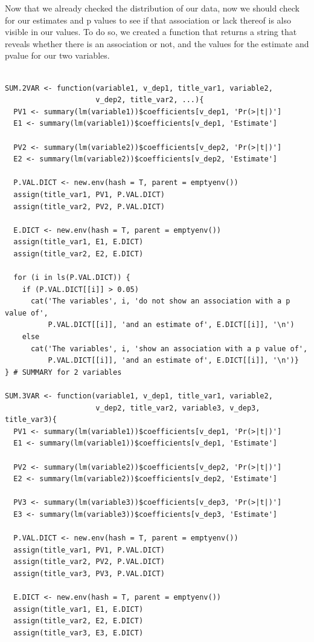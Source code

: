 \documentclass{article}
\begin{document}
Now that we already checked the distribution of our data, now we should check for our estimates and p values to see if that association or lack thereof is also visible in our values. To do so, we created a function that returns a string that reveals whether there is an association or not, and the values for the estimate and pvalue for our two variables.


\begin{lstlisting}

SUM.2VAR <- function(variable1, v_dep1, title_var1, variable2, 
                     v_dep2, title_var2, ...){
  PV1 <- summary(lm(variable1))$coefficients[v_dep1, 'Pr(>|t|)']
  E1 <- summary(lm(variable1))$coefficients[v_dep1, 'Estimate']
  
  PV2 <- summary(lm(variable2))$coefficients[v_dep2, 'Pr(>|t|)']
  E2 <- summary(lm(variable2))$coefficients[v_dep2, 'Estimate']
  
  P.VAL.DICT <- new.env(hash = T, parent = emptyenv())
  assign(title_var1, PV1, P.VAL.DICT)
  assign(title_var2, PV2, P.VAL.DICT)
  
  E.DICT <- new.env(hash = T, parent = emptyenv())
  assign(title_var1, E1, E.DICT)
  assign(title_var2, E2, E.DICT)
  
  for (i in ls(P.VAL.DICT)) {
    if (P.VAL.DICT[[i]] > 0.05)
      cat('The variables', i, 'do not show an association with a p value of',  
          P.VAL.DICT[[i]], 'and an estimate of', E.DICT[[i]], '\n')
    else
      cat('The variables', i, 'show an association with a p value of',  
          P.VAL.DICT[[i]], 'and an estimate of', E.DICT[[i]], '\n')}
} # SUMMARY for 2 variables

SUM.3VAR <- function(variable1, v_dep1, title_var1, variable2, 
                     v_dep2, title_var2, variable3, v_dep3, title_var3){
  PV1 <- summary(lm(variable1))$coefficients[v_dep1, 'Pr(>|t|)']
  E1 <- summary(lm(variable1))$coefficients[v_dep1, 'Estimate']
  
  PV2 <- summary(lm(variable2))$coefficients[v_dep2, 'Pr(>|t|)']
  E2 <- summary(lm(variable2))$coefficients[v_dep2, 'Estimate']
  
  PV3 <- summary(lm(variable3))$coefficients[v_dep3, 'Pr(>|t|)']
  E3 <- summary(lm(variable3))$coefficients[v_dep3, 'Estimate']
  
  P.VAL.DICT <- new.env(hash = T, parent = emptyenv())
  assign(title_var1, PV1, P.VAL.DICT)
  assign(title_var2, PV2, P.VAL.DICT)
  assign(title_var3, PV3, P.VAL.DICT)
  
  E.DICT <- new.env(hash = T, parent = emptyenv())
  assign(title_var1, E1, E.DICT)
  assign(title_var2, E2, E.DICT)
  assign(title_var3, E3, E.DICT)
  

\end{lstlisting}
\end{document}
